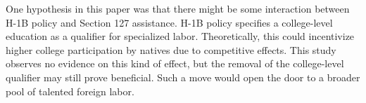 \documentclass[review]{elsarticle}
\begin{document}
One hypothesis in this paper was that there might be some interaction between H-1B policy and Section 127 assistance.
H-1B policy specifies a college-level education as a qualifier for specialized labor.
Theoretically, this could incentivize higher college participation by natives due to competitive effects.
This study observes no evidence on this kind of effect,
but the removal of the college-level qualifier may still prove beneficial.
Such a move would open the door to a broader pool of talented foreign labor.





\end{document}
